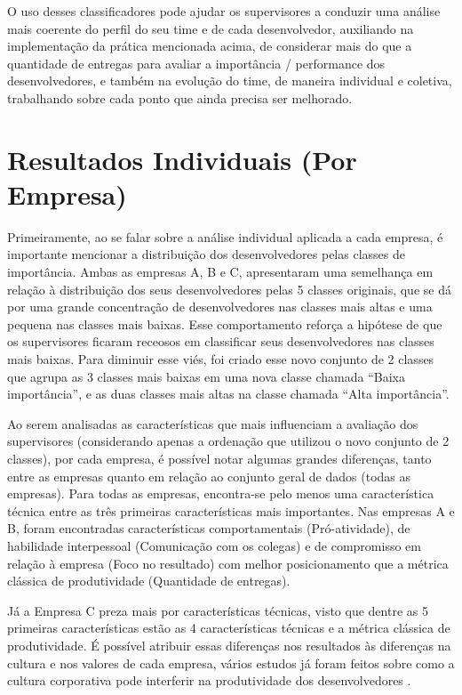 O uso desses classificadores pode ajudar os supervisores a conduzir uma análise mais coerente do perfil do seu time e de cada desenvolvedor, auxiliando na implementação da prática mencionada acima, de considerar mais do que a quantidade de entregas para avaliar a importância / performance dos desenvolvedores, e também na evolução do time, de maneira individual e coletiva, trabalhando sobre cada ponto que ainda precisa ser melhorado.

\section{Resultados Individuais (Por Empresa)}


Primeiramente, ao se falar sobre a análise individual aplicada a cada empresa, é importante mencionar a distribuição dos desenvolvedores pelas classes de importância. Ambas as empresas A, B e C, apresentaram uma semelhança em relação à distribuição dos seus desenvolvedores pelas 5 classes originais, que se dá por uma grande concentração de desenvolvedores nas classes mais altas e uma pequena nas classes mais baixas. Esse comportamento reforça a hipótese de que os supervisores ficaram receosos em classificar seus desenvolvedores nas classes mais baixas. Para diminuir esse viés, foi criado esse novo conjunto de 2 classes que agrupa as 3 classes mais baixas em uma nova classe chamada ``Baixa importância'', e as duas classes mais altas na classe chamada ``Alta importância''.


Ao serem analisadas as características que mais influenciam a avaliação dos supervisores (considerando apenas a ordenação que utilizou o novo conjunto de 2 classes), por cada empresa, é possível notar algumas grandes diferenças, tanto entre as empresas quanto em relação ao conjunto geral de dados (todas as empresas). Para todas as empresas, encontra-se pelo menos uma característica técnica entre as três primeiras características mais importantes. Nas empresas A e B, foram encontradas características comportamentais (Pró-atividade), de habilidade interpessoal (Comunicação com os colegas) e de compromisso em relação à empresa (Foco no resultado) com melhor posicionamento que a métrica clássica de produtividade (Quantidade de entregas).

Já a Empresa C preza mais por características técnicas, visto que dentre as 5 primeiras características estão as 4 características técnicas e a métrica clássica de produtividade. É possível atribuir essas diferenças nos resultados às diferenças na cultura e nos valores de cada empresa, vários estudos já foram feitos sobre como a cultura corporativa pode interferir na produtividade dos desenvolvedores \cite{Edmans2011,Jones2000,Scudder1991,AgrellA.andGustafson1994,Guzzo1988,McLean1996,Turcotte2004}.

